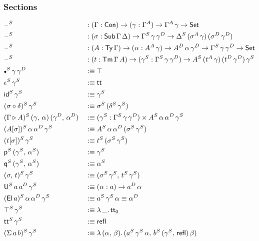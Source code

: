 \documentclass[12pt,a4paper,twoside,openany]{book}
\theoremstyle{remark}
\theoremstyle{definition}
\theoremstyle{theorem}
\newcommand{\refl}{\mathsf{refl}}
\newcommand{\id}{\mathsf{id}}
\newcommand{\Con}{\mathsf{Con}}
\newcommand{\Sub}{\mathsf{Sub}}
\newcommand{\Tm}{\mathsf{Tm}}
\newcommand{\Ty}{\mathsf{Ty}}
\newcommand{\U}{\mathsf{U}}
\newcommand{\El}{\mathsf{El}}
\renewcommand{\tt}{\mathsf{tt}}
\newcommand{\blank}{\mathord{\hspace{1pt}\text{--}\hspace{1pt}}}
\newcommand{\Set}{\mathsf{Set}}
\newcommand{\ext}{\triangleright}
\newcommand{\emptycon}{\scaleobj{.75}\bullet}
\newcommand{\p}{\mathsf{p}}
\newcommand{\q}{\mathsf{q}}
\newcommand{\defn}{:\equiv}
\begin{document}
\subsubsection{Sections}
\vspace{-0.5em}
\begin{alignat*}{3}
  &\blank^S &&: (\Gamma : \Con) \to (\gamma : \Gamma^A) \to \Gamma^A\,\gamma \to \Set\\
  &\blank^S &&: (\sigma : \Sub\,\Gamma\,\Delta) \to \Gamma^S\,\gamma\,\gamma^D \to \Delta^S\,(\sigma^A\,\gamma)\,(\sigma^D\,\gamma^D)\\
  &\blank^S &&: (A : \Ty\,\Gamma) \to (\alpha : A^A\,\gamma) \to A^D\,\alpha\,\gamma^D \to \Gamma^S\,\gamma\,\gamma^D \to \Set\\
  &\blank^S &&: (t : \Tm\,\Gamma\,A) \to (\gamma^S : \Gamma^S\,\gamma\,\gamma^D) \to A^S\,(t^A\,\gamma)\,(t^D\,\gamma^D)\,\gamma^S\\
  &\emptycon^S\,\gamma\,\gamma^D &&\defn \top \\
  &\epsilon^S\,\gamma^S &&\defn \tt\\
  &\id^S\,\gamma^S &&\defn \gamma^S\\
  &(\sigma \circ \delta)^S\,\gamma^S &&\defn \sigma^S\,(\delta^S\,\gamma^S)\\
  &(\Gamma \ext A)^S\,(\gamma,\,\alpha)\,(\gamma^D,\,\alpha^D) &&\defn
    (\gamma^S : \Gamma^S\,\gamma\,\gamma^D) \times A^S\,\alpha\,\alpha^D\,\gamma^S\\
  &(A[\sigma])^S\,\alpha\,\alpha^D\,\gamma^S &&\defn A^S\,\alpha\,\alpha^D\,(\sigma^S\,\gamma^S)\\
  &(t[\sigma])^S\,\gamma^S &&\defn t^S\,(\sigma^S\,\gamma^S)\\
  &\p^S\,(\gamma^S,\,\alpha^S) &&\defn \gamma^S\\
  &\q^S\,(\gamma^S,\,\alpha^S) &&\defn \alpha^S\\
  &(\sigma,\,t)^S\,\gamma^S &&\defn (\sigma^S\,\gamma^S,\,t^S\,\gamma^S)\\
  &\U^S\,a\,a^D\,\gamma^S &&\defn (\alpha : a) \to a^D\,\alpha\\
  &(\El\,a)^S\,\alpha\,\alpha^D\,\gamma^S &&\defn a^S\,\gamma^S\,\alpha \equiv \alpha^D \\
  &\top^S\,\gamma^S &&\defn \lambda\,\_.\,\tt_0\\
  &\tt^S\,\gamma^S &&\defn \refl\\
  &(\Sigma\,a\,b)^S\,\gamma^S &&\defn \lambda\,(\alpha,\,\beta).\,(a^S\,\gamma^S\,\alpha,\,b^S\,(\gamma^S,\,\refl)\,\beta)\\

\end{alignat*}
\end{document}
